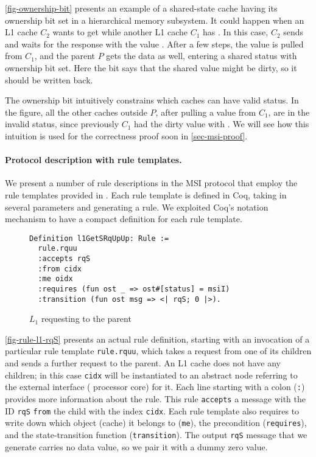 \documentclass[sigplan,10pt,review,anonymous,screen]{acmart}\settopmatter{printfolios=true,printccs=false,printacmref=false}
\def\slstinline{\lstinline[basicstyle=\ttfamily\small]}
\begin{document}
\autoref{fig-ownership-bit} presents an example of a shared-state cache having its ownership bit set in a hierarchical memory subsystem.
It could happen when an L1 cache $C_2$ wants to get \stS{} while another L1 cache $C_1$ has \stM{}.
In this case, $C_2$ sends  and waits for the response with the value .
After a few steps, the value is pulled from $C_1$, and the parent $P$ gets the data as well, entering a shared status with ownership bit set.
Here the bit says that the shared value might be dirty, so it should be written back.

The ownership bit intuitively constrains which caches can have valid status.
In the figure, all the other caches outside $P$, after pulling a value from $C_1$, are in the invalid status, since previously $C_1$ had the dirty value with \stM{}.
We will see how this intuition is used for the correctness proof soon in \autoref{sec-msi-proof}.

\paragraph{Protocol description with rule templates.}

We present a number of rule descriptions in the MSI protocol that employ the rule templates provided in \hemiola{}.
Each rule template is defined in Coq, taking in several parameters and generating a rule.
We exploited Coq's notation mechanism to have a compact definition for each rule template.

\begin{figure}[h]
  \centering
\begin{lstlisting}
Definition l1GetSRqUpUp: Rule :=
  rule.rquu
  :accepts rqS
  :from cidx
  :me oidx
  :requires (fun ost _ => ost#[status] = msiI)
  :transition (fun ost msg => <| rqS; 0 |>).
\end{lstlisting}
  \caption{$L_1$ requesting \stS{} to the parent}
  \label{fig-rule-l1-rqS}
\end{figure}

\autoref{fig-rule-l1-rqS} presents an actual rule definition, starting with an invocation of a particular rule template \slstinline{rule.rquu}, which takes a request from one of its children and sends a further request to the parent.
An L1 cache does not have any children; in this case \slstinline{cidx} will be instantiated to an abstract node referring to the external interface (\ie{} processor core) for it.
Each line starting with a colon (\slstinline{:}) provides more information about the rule.
This rule \slstinline{accepts} a message with the ID \slstinline{rqS} \slstinline{from} the child with the index \slstinline{cidx}.
Each rule template also requires to write down which object (cache) it belongs to (\slstinline{me}), the precondition (\slstinline{requires}), and the state-transition function (\slstinline{transition}).
The output \slstinline{rqS} message that we generate carries no data value, so we pair it with a dummy zero value.
\end{document}
